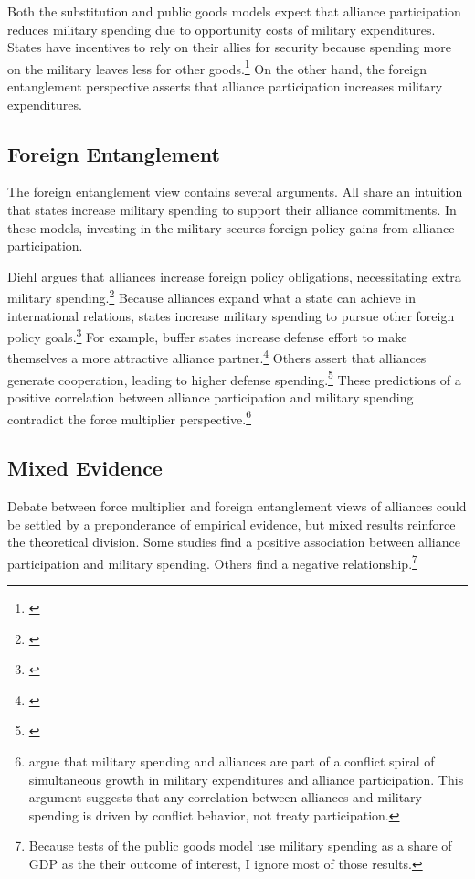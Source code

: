 \documentclass[12pt]{article}
\begin{document}
Both the substitution and public goods models expect that alliance participation reduces military spending due to opportunity costs of military expenditures. 
States have incentives to rely on their allies for security because spending more on the military leaves less for other goods.\footnote{\cite{Fordham1998}}
On the other hand, the foreign entanglement perspective asserts that alliance participation increases military expenditures. 


\subsection{Foreign Entanglement}


The foreign entanglement view contains several arguments.
All share an intuition that states increase military spending to support their alliance commitments. 
In these models, investing in the military secures foreign policy gains from alliance participation. 


Diehl argues that alliances increase foreign policy obligations, necessitating extra military spending.\footnote{\cite{Diehl1994}}
Because alliances expand what a state can achieve in international relations, states increase military spending to pursue other foreign policy goals.\footnote{\cite{MorganPalmer2006}}
For example, buffer states increase defense effort to make themselves a more attractive alliance partner.\footnote{\cite{Horowitzetal2017}}
Others assert that alliances generate cooperation, leading to higher defense spending.\footnote{\cite{Palmer1990, QuirozFlores2011}} 
These predictions of a positive correlation between alliance participation and military spending contradict the force multiplier perspective.\footnote{
\citet{SeneseVasquez2008} argue that military spending and alliances are part of a conflict spiral of simultaneous growth in military expenditures and alliance participation. 
This argument suggests that any correlation between alliances and military spending is driven by conflict behavior, not treaty participation.
}


\subsection{Mixed Evidence} 


Debate between force multiplier and foreign entanglement views of alliances could be settled by a preponderance of empirical evidence, but mixed results reinforce the theoretical division.
Some studies find a positive association between alliance participation and military spending. 
Others find a negative relationship.\footnote{
Because tests of the public goods model use military spending as a share of GDP as the their outcome of interest, I ignore most of those results.}
\end{document}
